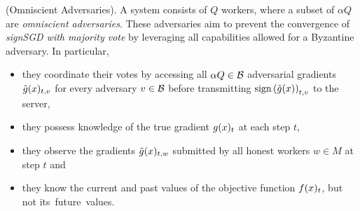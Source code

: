 \begin{definition} \label{omniscient} \textnormal{(Omniscient Adversaries).} A system consists of $Q$ workers, where a subset of $\alpha Q$ are 	\emph{omniscient adversaries}. These adversaries aim to prevent the convergence of 	\emph{signSGD with majority vote} by leveraging all capabilities allowed for a Byzantine adversary. In particular, 
\begin{itemize}
    \item they coordinate their votes by accessing all $\alpha Q \in \mathcal B$ adversarial gradients $\tilde{g}(x)_{t, v}$ for every adversary $v \in \mathcal B$ before transmitting $\textnormal{sign}\left(\tilde{g}(x)\right)_{t, v}$ to the server, 
    
    \item they possess knowledge of the true gradient $g(x)_t$ at each step $t$, 
    \item they observe the gradients $\tilde{g}(x)_{t, w}$ submitted by all honest workers $w \in M$ at step $t$ and
    \item they know the current and past values of the objective function $f(x)_t$, but not its~future~values.
\end{itemize}

\end{definition}